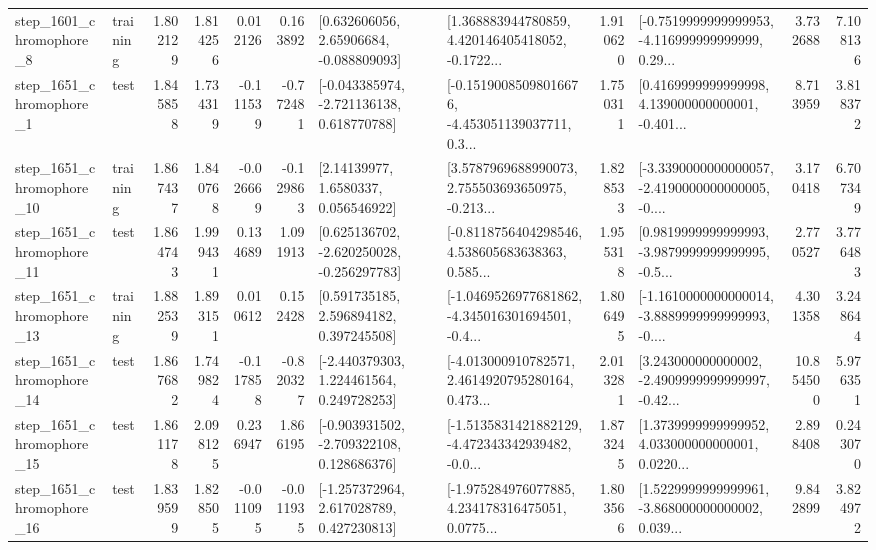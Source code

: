 \begin{tabular}{llrrrrllrlrr}
  step\_1601\_chromophore\_8 &  training &      1.802129 &    1.814256 &      0.012126 &  0.163892 &     [0.632606056, 2.65906684, -0.088809093] &  [1.368883944780859, 4.420146405418052, -0.1722... &       1.910620 &  [-0.7519999999999953, -4.116999999999999, 0.29... &            3.732688 &          7.108136 \\
  step\_1651\_chromophore\_1 &      test &      1.845858 &    1.734319 &     -0.111539 & -0.772481 &   [-0.043385974, -2.721136138, 0.618770788] &  [-0.15190085098016676, -4.453051139037711, 0.3... &       1.750311 &  [0.4169999999999998, 4.139000000000001, -0.401... &            8.713959 &          3.818372 \\
 step\_1651\_chromophore\_10 &  training &      1.867437 &    1.840768 &     -0.026669 & -0.129863 &        [2.14139977, 1.6580337, 0.056546922] &  [3.5787969688990073, 2.755503693650975, -0.213... &       1.828533 &  [-3.3390000000000057, -2.4190000000000005, -0.... &            3.170418 &          6.707349 \\
 step\_1651\_chromophore\_11 &      test &      1.864743 &    1.999431 &      0.134689 &  1.091913 &   [0.625136702, -2.620250028, -0.256297783] &  [-0.8118756404298546, 4.538605683638363, 0.585... &       1.955318 &  [0.9819999999999993, -3.9879999999999995, -0.5... &            2.770527 &          3.776483 \\
 step\_1651\_chromophore\_13 &  training &      1.882539 &    1.893151 &      0.010612 &  0.152428 &     [0.591735185, 2.596894182, 0.397245508] &  [-1.0469526977681862, -4.345016301694501, -0.4... &       1.806495 &  [-1.1610000000000014, -3.8889999999999993, -0.... &            4.301358 &          3.248644 \\
 step\_1651\_chromophore\_14 &      test &      1.867682 &    1.749824 &     -0.117858 & -0.820327 &    [-2.440379303, 1.224461564, 0.249728253] &  [-4.013000910782571, 2.4614920795280164, 0.473... &       2.013281 &  [3.243000000000002, -2.4909999999999997, -0.42... &           10.854500 &          5.976351 \\
 step\_1651\_chromophore\_15 &      test &      1.861178 &    2.098125 &      0.236947 &  1.866195 &   [-0.903931502, -2.709322108, 0.128686376] &  [-1.5135831421882129, -4.472343342939482, -0.0... &       1.873245 &  [1.3739999999999952, 4.033000000000001, 0.0220... &            2.898408 &          0.243070 \\
 step\_1651\_chromophore\_16 &      test &      1.839599 &    1.828505 &     -0.011095 & -0.011935 &    [-1.257372964, 2.617028789, 0.427230813] &  [-1.975284976077885, 4.234178316475051, 0.0775... &       1.803566 &  [1.5229999999999961, -3.868000000000002, 0.039... &            9.842899 &          3.824972 \\

\end{tabular}
